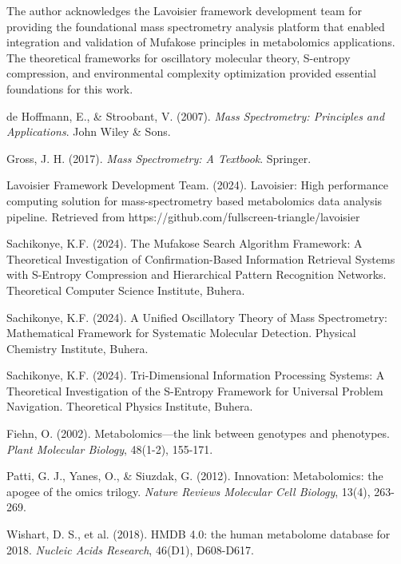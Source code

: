 \documentclass[12pt,a4paper]{article}
\begin{document}
The author acknowledges the Lavoisier framework development team for providing the foundational mass spectrometry analysis platform that enabled integration and validation of Mufakose principles in metabolomics applications. The theoretical frameworks for oscillatory molecular theory, S-entropy compression, and environmental complexity optimization provided essential foundations for this work.

\begin{thebibliography}{99}

de Hoffmann, E., \& Stroobant, V. (2007). \textit{Mass Spectrometry: Principles and Applications}. John Wiley \& Sons.

Gross, J. H. (2017). \textit{Mass Spectrometry: A Textbook}. Springer.

Lavoisier Framework Development Team. (2024). Lavoisier: High performance computing solution for mass-spectrometry based metabolomics data analysis pipeline. Retrieved from https://github.com/fullscreen-triangle/lavoisier

Sachikonye, K.F. (2024). The Mufakose Search Algorithm Framework: A Theoretical Investigation of Confirmation-Based Information Retrieval Systems with S-Entropy Compression and Hierarchical Pattern Recognition Networks. Theoretical Computer Science Institute, Buhera.

Sachikonye, K.F. (2024). A Unified Oscillatory Theory of Mass Spectrometry: Mathematical Framework for Systematic Molecular Detection. Physical Chemistry Institute, Buhera.

Sachikonye, K.F. (2024). Tri-Dimensional Information Processing Systems: A Theoretical Investigation of the S-Entropy Framework for Universal Problem Navigation. Theoretical Physics Institute, Buhera.

Fiehn, O. (2002). Metabolomics—the link between genotypes and phenotypes. \textit{Plant Molecular Biology}, 48(1-2), 155-171.

Patti, G. J., Yanes, O., \& Siuzdak, G. (2012). Innovation: Metabolomics: the apogee of the omics trilogy. \textit{Nature Reviews Molecular Cell Biology}, 13(4), 263-269.

Wishart, D. S., et al. (2018). HMDB 4.0: the human metabolome database for 2018. \textit{Nucleic Acids Research}, 46(D1), D608-D617.


\end{thebibliography}
\end{document}
